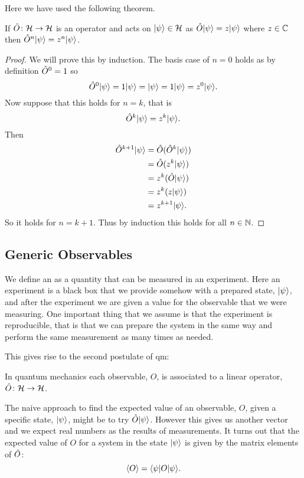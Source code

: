     Here we have used the following theorem.
    \begin{theorem}\label{thm:op^n ket = eigenvalue^n ket}
        If \(\hat{O}\colon\mathcal{H}\to\mathcal{H}\) is an operator and acts on \(\vert {\psi} \rangle\in\mathcal{H}\) as \(\hat{O}\vert {\psi} \rangle = z\vert {\psi} \rangle\) where \(z\in\mathbb{C}\) then \(\hat{O}^n\vert {\psi} \rangle = z^n\vert {\psi} \rangle\).
    \end{theorem}
    \begin{proof}
        We will prove this by induction.
        The basis case of \(n = 0\) holds as by definition \(\hat{O}^0 = 1\) so
        \[\hat{O}^0\vert {\psi} \rangle = 1\vert {\psi} \rangle = \vert {\psi} \rangle = 1\vert {\psi} \rangle = z^0\vert {\psi} \rangle.\]
        Now suppose that this holds for \(n = k\), that is
        \[\hat{O}^k\vert {\psi} \rangle = z^k\vert {\psi} \rangle.\]
        Then
        \begin{align*}
            \hat{O}^{k+1}\vert {\psi} \rangle &= \hat{O}(\hat{O}^k\vert {\psi} \rangle)\\
            &= \hat{O}(z^k\vert {\psi} \rangle)\\
            &= z^k(\hat{O}\vert {\psi} \rangle)\\
            &= z^k(z\vert {\psi} \rangle)\\
            &= z^{k+1}\vert {\psi} \rangle.
        \end{align*}
        So it holds for \(n = k + 1\).
        Thus by induction this holds for all \(n \in\mathbb{N}\).
    \end{proof}
    
    \subsection{Generic Observables}
    We define an  as a quantity that can be measured in an experiment.
    Here an experiment is a black box that we provide somehow with a prepared state, \(\vert {\psi} \rangle\), and after the experiment we are given a value for the observable that we were measuring.
    One important thing that we assume is that the experiment is reproducible, that is that we can prepare the system in the same way and perform the same measurement as many times as needed.
    
    This gives rise to the second postulate of \acrshort{qm}:
    \begin{postulate}
        In quantum mechanics each observable, \(O\), is associated to a linear operator, \(\hat{O}\colon\mathcal{H}\to\mathcal{H}\).
    \end{postulate}
    The naive approach to find the expected value of an observable, \(O\), given a specific state, \(\vert {\psi} \rangle\), might be to try \(\hat{O}\vert {\psi} \rangle\).
    However this gives us another vector and we expect real numbers as the results of measurements.
    It turns out that the expected value of \(O\) for a system in the state \(\vert {\psi} \rangle\) is given by the matrix elements of \(\hat{O}\):
    \[\langle{O}\rangle = \langle {\psi} \vert O\vert {\psi} \rangle.\]
    
